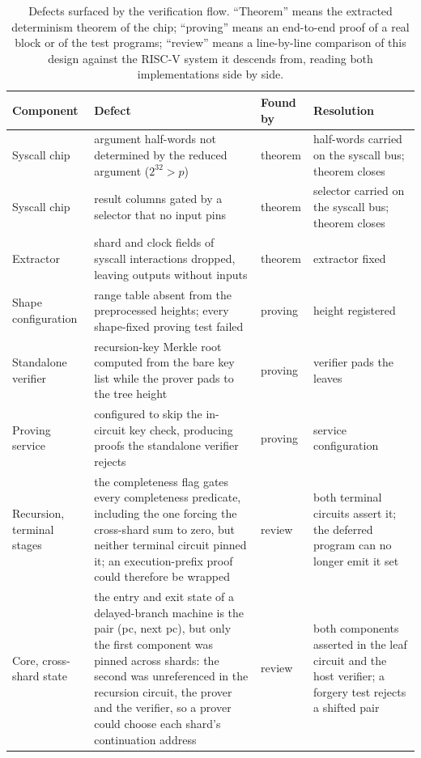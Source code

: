 \begin{table}[t]
\centering
\small
\caption{Defects surfaced by the verification flow. ``Theorem'' means the extracted determinism theorem of the chip; ``proving'' means an end-to-end proof of a real block or of the test programs; ``review'' means a line-by-line comparison of this design against the RISC-V system it descends from, reading both implementations side by side.}
\label{tab:defects}
\begin{tabular}{>{\raggedright\arraybackslash}p{} >{\raggedright\arraybackslash}p{} >{\raggedright\arraybackslash}p{} >{\raggedright\arraybackslash}p{}}
\toprule
Component & Defect & Found by & Resolution \\
\midrule
Syscall chip & argument half-words not determined by the reduced argument ($2^{32} > p$) & theorem & half-words carried on the syscall bus; theorem closes \\
Syscall chip & result columns gated by a selector that no input pins & theorem & selector carried on the syscall bus; theorem closes \\
Extractor & shard and clock fields of syscall interactions dropped, leaving outputs without inputs & theorem & extractor fixed \\
Shape configuration & range table absent from the preprocessed heights; every shape-fixed proving test failed & proving & height registered \\
Standalone verifier & recursion-key Merkle root computed from the bare key list while the prover pads to the tree height & proving & verifier pads the leaves \\
Proving service & configured to skip the in-circuit key check, producing proofs the standalone verifier rejects & proving & service configuration \\
Recursion, terminal stages & the completeness flag gates every completeness predicate, including the one forcing the cross-shard sum to zero, but neither terminal circuit pinned it; an execution-prefix proof could therefore be wrapped & review & both terminal circuits assert it; the deferred program can no longer emit it set \\
Core, cross-shard state & the entry and exit state of a delayed-branch machine is the pair (pc, next pc), but only the first component was pinned across shards: the second was unreferenced in the recursion circuit, the prover and the verifier, so a prover could choose each shard's continuation address & review & both components asserted in the leaf circuit and the host verifier; a forgery test rejects a shifted pair \\

\end{tabular}
\end{table}
